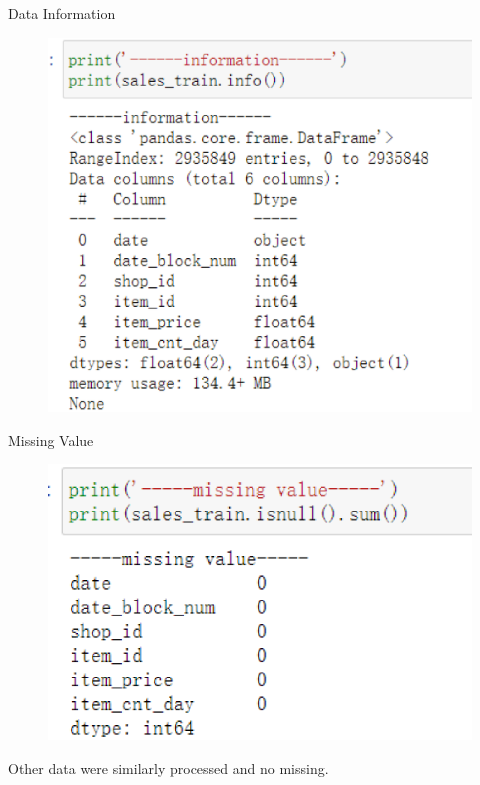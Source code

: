 \documentclass[
 size=14pt,
 paper=smartboard,  %
 mode=present, 		%
 display=slides, 	%
 style=tuliplab,  	%
 pauseslide,
 fleqn,leqno]{powerdot}
\begin{document}
\begin{slide}[toc=,bm=]{Data Information}
  \begin{figure}
    \includegraphics[scale=0.5]{picture/data_5.eps}
  \end{figure}
\end{slide}

\begin{slide}[toc=,bm=]{Missing Value}
  \begin{figure}
    \includegraphics[scale=0.5]{picture/data_3.eps}
  \end{figure}
  Other data were similarly processed and no missing.
\end{slide}
\end{document}
